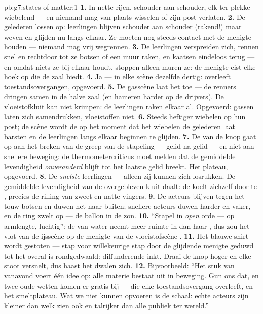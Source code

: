 \begin{solution}{pb:g7:states-of-matter:1}
\textbf{1.} In nette rijen, schouder aan schouder, elk ter plekke
wiebelend --- en niemand mag van plaats wisselen of zijn post
verlaten.
\textbf{2.} De gelederen lossen op: leerlingen blijven schouder aan
schouder (rakend!) maar weven en glijden nu langs elkaar. Ze moeten
nog steeds contact met de menigte houden --- niemand mag vrij
wegrennen.
\textbf{3.} De leerlingen verspreiden zich, rennen snel en rechtdoor
tot ze botsen of een muur raken, en kaatsen eindeloos terug --- en
omdat niets ze bij elkaar houdt, stoppen alleen muren ze: de menigte
eist elke hoek op die de zaal biedt.
\textbf{4.} Ja --- in elke scène dezelfde dertig:  overleeft
toestandsovergangen, opgevoerd.
\textbf{5.} De gasscène laat het toe --- de renners dringen samen in de
halve zaal (en hameren harder op de drijvers). De
vloeistofkluit kan niet krimpen: de leerlingen raken elkaar al.
Opgevoerd: gassen laten zich samendrukken, vloeistoffen niet.
\textbf{6.} Steeds heftiger wiebelen op hun post; de scène wordt de
 op het moment dat het wiebelen de gelederen laat barsten
en de leerlingen langs elkaar beginnen te glijden.
\textbf{7.} De  van de knop gaat op aan het breken van de greep
van de stapeling --- gelid na gelid --- en niet aan snellere beweging:
de thermometercriticus moet melden dat de gemiddelde levendigheid
\emph{onveranderd} blijft tot het laatste gelid breekt. Het plateau,
opgevoerd.
\textbf{8.} De \emph{snelste} leerlingen --- alleen zij kunnen zich
losrukken. De gemiddelde levendigheid van de overgebleven kluit daalt:
de  koelt zichzelf door te , precies de rilling van
zweet en natte vingers.
\textbf{9.} De acteurs blijven tegen het touw botsen en duwen het naar
buiten; snellere acteurs duwen harder en vaker, en de ring zwelt op
--- de ballon in de zon.
\textbf{10.} ``Stapel in \emph{open} orde --- op armlengte, luchtig'':
de  van water neemt meer ruimte in dan haar
, dus zou het vlot van de ijsscène op de menigte van de
vloeistofscène .
\textbf{11.} Het blauwe shirt wordt gestoten --- stap voor
willekeurige stap door de glijdende menigte geduwd tot het overal is
rondgedwaald: diffunderende inkt. Draai de knop hoger en elke stoot
versnelt, dus haast het dwalen zich.
\textbf{12.} Bijvoorbeeld: ``Het stuk van vanavond voert één idee op:
alle materie bestaat uit  in beweging. Gun ons dat, en twee
oude wetten komen er gratis bij ---  die elke
toestandsovergang overleeft, en het smeltplateau. Wat we niet kunnen
opvoeren is de schaal: echte acteurs zijn kleiner dan welk zien ook en
talrijker dan alle publiek ter wereld.''
\end{solution}
